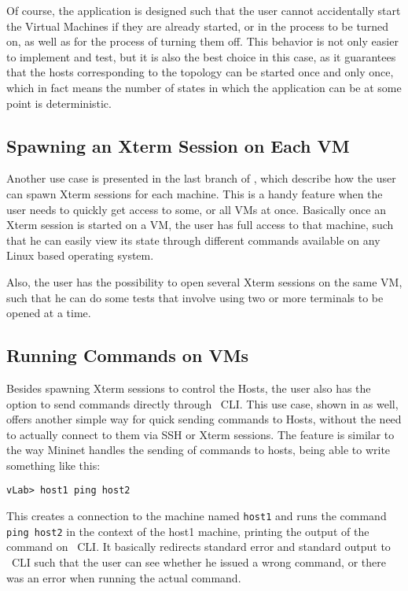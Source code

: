 Of course, the application is designed such that the user cannot accidentally start the Virtual Machines if they are already started, or in the process to be turned on, as well as for the process of turning them off.
This behavior is not only easier to implement and test, but it is also the best choice in this case, as it guarantees that the hosts corresponding to the topology can be started once and only once, which in fact means the number of states in which the application can be at some point is deterministic.

\subsection{Spawning an Xterm Session on Each VM}
\label{sub-sec:spawn-xterm}

Another use case is presented in the last branch of  , which describe how the user can spawn Xterm sessions for each machine.
This is a handy feature when the user needs to quickly get access to some, or all VMs at once.
Basically once an Xterm session is started on a VM, the user has full access to that machine, such that he can easily view its state through different commands available on any Linux based operating system.

Also, the user has the possibility to open several Xterm sessions on the same VM, such that he can do some tests that involve using two or more terminals to be opened at a time.

\subsection{Running Commands on VMs}
\label{sub-sec:run-cmd}

Besides spawning Xterm sessions to control the Hosts, the user also has the option to send commands directly through \project\ CLI.
This use case, shown in  as well, offers another simple way for quick sending commands to Hosts, without the need to actually connect to them via SSH or Xterm sessions.
The feature is similar to the way Mininet handles the sending of commands to hosts, being able to write something like this:

\lstset{label=lst:ping-example}
\begin{lstlisting}
vLab> host1 ping host2
\end{lstlisting}

This creates a connection to the machine named \texttt{host1} and runs the command \texttt{ping host2} in the context of the host1 machine, printing the output of the command on \project\ CLI.
It basically redirects standard error and standard output to \project\ CLI such that the user can see whether he issued a wrong command, or there was an error when running the actual command.

